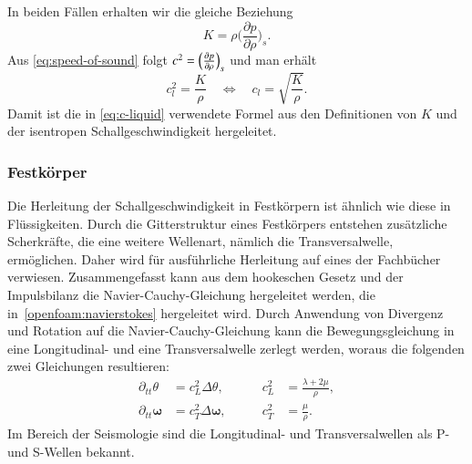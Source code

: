In beiden Fällen erhalten wir die gleiche Beziehung
\begin{equation*}
    K = \rho\biggl(\frac{\partial p}{\partial \rho}\biggr)_{s}.
\end{equation*}
Aus \eqref{eq:speed-of-sound} folgt
$c^2=\Bigl(\frac{\partial p}{\partial \rho}\Bigr)_s$
und man erhält
\begin{equation*}
    c_l^2 = \frac{K}{\rho} \quad \Leftrightarrow \quad c_l=\sqrt{\frac{K}{\rho}}.
\end{equation*}
Damit ist die in \eqref{eq:c-liquid} verwendete Formel aus den Definitionen von $K$
und der isentropen Schallgeschwindigkeit hergeleitet.

\subsubsection{Festkörper}
Die Herleitung der Schallgeschwindigkeit in Festkörpern ist ähnlich wie diese
in Flüssigkeiten. Durch die Gitterstruktur eines Festkörpers entstehen
zusätzliche Scherkräfte, die eine weitere Wellenart, nämlich die
Transversalwelle, ermöglichen. Daher wird für ausführliche Herleitung
auf eines der Fachbücher \cite{schall:landaulifschitz,schall:gurtin}
verwiesen.
Zusammengefasst kann aus dem hookeschen Gesetz und der Impulsbilanz
die Navier-Cauchy-Gleichung hergeleitet werden, die in~\ref{openfoam:navierstokes}
%
hergeleitet wird.
Durch Anwendung von Divergenz und Rotation auf die Navier-Cauchy-Gleichung
kann die Bewegungsgleichung in eine Longitudinal- und eine Transversalwelle
zerlegt werden, woraus die folgenden zwei Gleichungen resultieren:
\[
\begin{aligned}
    \partial_{tt}\theta &= c_L^2\Delta\theta, & \qquad c_L^2 &= \frac{\lambda+2\mu}{\rho} ,\\
    \partial_{tt}\boldsymbol{\omega} &= c_T^2\Delta\boldsymbol{\omega}, & \qquad c_T^2 &= \frac{\mu}{\rho} .
\end{aligned}
\]
Im Bereich der Seismologie sind die Longitudinal- und Transversalwellen als
P- und S-Wellen bekannt.

